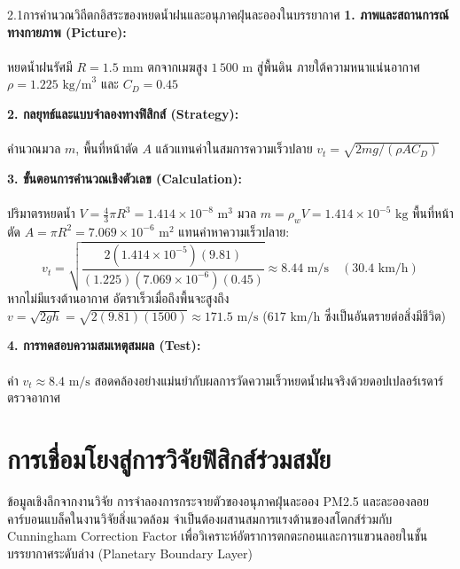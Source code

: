 \begin{psctexample}{2.1}{การคำนวณวิถีตกอิสระของหยดน้ำฝนและอนุภาคฝุ่นละอองในบรรยากาศ}
\textbf{1. ภาพและสถานการณ์ทางกายภาพ (Picture):}\\\\ หยดน้ำฝนรัศมี $R = 1.5\text{ mm}$ ตกจากเมฆสูง $1\,500\text{ m}$ สู่พื้นดิน ภายใต้ความหนาแน่นอากาศ $\rho = 1.225\text{ kg/m}^3$ และ $C_D = 0.45$

\vspace{4pt}
\textbf{2. กลยุทธ์และแบบจำลองทางฟิสิกส์ (Strategy):}\\\\ คำนวณมวล $m$, พื้นที่หน้าตัด $A$ แล้วแทนค่าในสมการความเร็วปลาย $v_t = \sqrt{2mg/(\rho A C_D)}$

\vspace{4pt}
\textbf{3. ขั้นตอนการคำนวณเชิงตัวเลข (Calculation):}\\\\ ปริมาตรหยดน้ำ $V = \frac{4}{3}\pi R^3 = 1.414 \times 10^{-8}\text{ m}^3$ มวล $m = \rho_w V = 1.414 \times 10^{-5}\text{ kg}$
พื้นที่หน้าตัด $A = \pi R^2 = 7.069 \times 10^{-6}\text{ m}^2$
แทนค่าหาความเร็วปลาย:
\begin{equation}
v_t = \sqrt{\frac{2(1.414 \times 10^{-5})(9.81)}{(1.225)(7.069 \times 10^{-6})(0.45)}} \approx 8.44\text{ m/s} \quad (30.4\text{ km/h})
\end{equation}
หากไม่มีแรงต้านอากาศ อัตราเร็วเมื่อถึงพื้นจะสูงถึง $v = \sqrt{2gh} = \sqrt{2(9.81)(1500)} \approx 171.5\text{ m/s}$ ($617\text{ km/h}$ ซึ่งเป็นอันตรายต่อสิ่งมีชีวิต)

\vspace{4pt}
\textbf{4. การทดสอบความสมเหตุสมผล (Test):}\\\\ ค่า $v_t \approx 8.4\text{ m/s}$ สอดคล้องอย่างแม่นยำกับผลการวัดความเร็วหยดน้ำฝนจริงด้วยดอปเปลอร์เรดาร์ตรวจอากาศ
\end{psctexample}

\section{การเชื่อมโยงสู่การวิจัยฟิสิกส์ร่วมสมัย}

\begin{researchbox}{ข้อมูลเชิงลึกจากงานวิจัย}
การจำลองการกระจายตัวของอนุภาคฝุ่นละออง PM2.5 และละอองลอยคาร์บอนแบล็คในงานวิจัยสิ่งแวดล้อม จำเป็นต้องผสานสมการแรงต้านของสโตกส์ร่วมกับ Cunningham Correction Factor เพื่อวิเคราะห์อัตราการตกตะกอนและการแขวนลอยในชั้นบรรยากาศระดับล่าง (Planetary Boundary Layer)
\end{researchbox}


